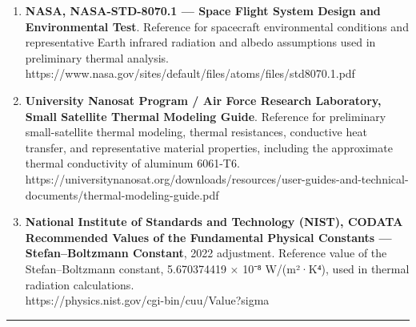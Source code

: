 \documentclass[
]{book}
\begin{document}
\begin{enumerate}
  \textbf{All About Circuits, ``Swarm Communication With CubeSats: Advantages and Challenges of Nanosatellites''}. Source and image credit for the illustration of standardized CubeSat sizes and configurations.\\
  https://www.allaboutcircuits.com/news/swarm-communication-cubesats-advantages-challenges-nanosatellites-satellite/
\item
  \textbf{NASA, NASA-STD-8070.1 --- Space Flight System Design and Environmental Test}. Reference for spacecraft environmental conditions and representative Earth infrared radiation and albedo assumptions used in preliminary thermal analysis.\\
  https://www.nasa.gov/sites/default/files/atoms/files/std8070.1.pdf
\item
  \textbf{University Nanosat Program / Air Force Research Laboratory, Small Satellite Thermal Modeling Guide}. Reference for preliminary small-satellite thermal modeling, thermal resistances, conductive heat transfer, and representative material properties, including the approximate thermal conductivity of aluminum 6061-T6.\\
  https://universitynanosat.org/downloads/resources/user-guides-and-technical-documents/thermal-modeling-guide.pdf
\item
  \textbf{National Institute of Standards and Technology (NIST), CODATA Recommended Values of the Fundamental Physical Constants --- Stefan--Boltzmann Constant}, 2022 adjustment. Reference value of the Stefan--Boltzmann constant, 5.670374419 × 10⁻⁸ W/(m²·K⁴), used in thermal radiation calculations.\\
  https://physics.nist.gov/cgi-bin/cuu/Value?sigma
\end{enumerate}

\begin{center}\rule{0.5\linewidth}{0.5pt}\end{center}

\backmatter
\end{document}
